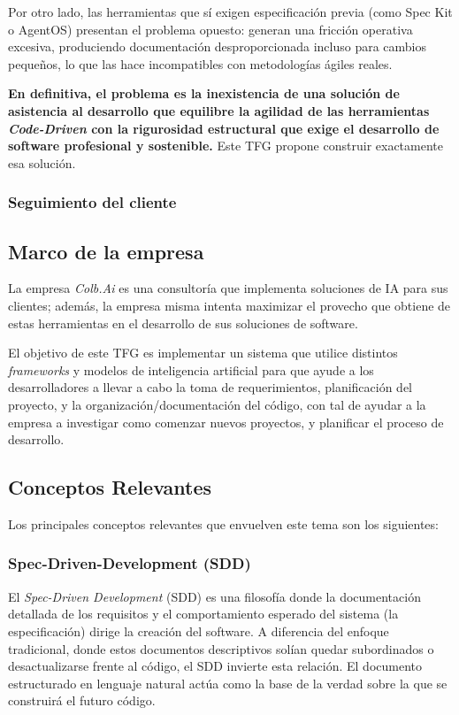 Por otro lado, las herramientas que sí exigen especificación previa (como Spec Kit o AgentOS) presentan el problema opuesto: generan una fricción operativa excesiva, produciendo documentación desproporcionada incluso para cambios pequeños, lo que las hace incompatibles con metodologías ágiles reales.

\textbf{En definitiva, el problema es la inexistencia de una solución de asistencia al desarrollo que equilibre la agilidad de las herramientas \textit{Code-Driven} con la rigurosidad estructural que exige el desarrollo de software profesional y sostenible.} Este TFG propone construir exactamente esa solución.

\subsubsection{Seguimiento del cliente}

\subsection{Marco de la empresa}
\label{sec:marco_empresa}

La empresa \textit{Colb.Ai} es una consultoría que implementa soluciones de IA para sus clientes; además, la empresa misma intenta maximizar el provecho que obtiene de estas herramientas en el desarrollo de sus soluciones de software.

El objetivo de este TFG es implementar un sistema que utilice distintos \textit{frameworks} y modelos de inteligencia artificial para que ayude a los desarrolladores a llevar a cabo la toma de requerimientos, planificación del proyecto, y la organización/documentación del código, con tal de ayudar a la empresa a investigar como comenzar nuevos proyectos, y planificar el proceso de desarrollo.

\subsection{Conceptos Relevantes}
\label{sec:conceptos_relevantes}
Los principales conceptos relevantes que envuelven este tema son los siguientes:

\subsubsection{Spec-Driven-Development (SDD)}
\label{sec:sdd}

El \textit{Spec-Driven Development} (SDD) es una filosofía donde la documentación detallada de los requisitos y el comportamiento esperado del sistema (la especificación) dirige la creación del software. A diferencia del enfoque tradicional, donde estos documentos descriptivos solían quedar subordinados o desactualizarse frente al código, el SDD invierte esta relación. El documento estructurado en lenguaje natural actúa como la base de la verdad sobre la que se construirá el futuro código. \cite{ostroff_agile_2004} \cite{github_spec_kit}

